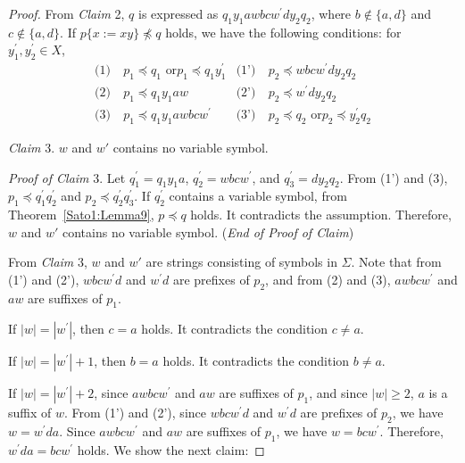 \begin{proof}
  \smallskip

  From \textit{Claim} 2, $q$ is expressed as $q_{1}y_{1}awbcw^{\prime}dy_{2}q_{2}$, where $b \not\in \{a,d\}$ and $c \not\in \{a,d\}$.
  If $p \{ x := xy \} \not \preceq q$ holds, we have the following conditions:
  for $y_{1}^{\prime},y_{2}^{\prime}\in X$,
  \begin{align*}
    \textrm{(1)}~& p_{1} \preceq q_{1} \mbox{ or} p_{1} \preceq q_{1}y_{1}^{\prime} & \textrm{(1')}~& p_{2} \preceq wbcw^{\prime}dy_{2}q_{2} \\
    \textrm{(2)}~& p_{1} \preceq q_{1}y_{1}aw & \textrm{(2')}~& p_{2} \preceq w^{\prime}dy_{2}q_{2} \\
    \textrm{(3)}~& p_{1} \preceq q_{1}y_{1}awbcw^{\prime} & \textrm{(3')}~& p_{2} \preceq q_{2} \mbox{ or} p_{2} \preceq y_{2}^{\prime}q_{2}
  \end{align*}

  \smallskip

  \noindent
  \textit{Claim} 3. $w$ and $w'$ contains no variable symbol.

  \smallskip
  \noindent
  \textit{Proof of Claim} 3.
  Let $q_{1}^{\prime} = q_{1}y_{1}a$, $q_{2}^{\prime} = wbcw^{\prime}$, and $q_{3}^{\prime} = dy_{2}q_{2}$. From (1') and (3), $p_{1} \preceq q^{\prime}_{1}q^{\prime}_{2}$ and $p_{2} \preceq q^{\prime}_{2}q^{\prime}_{3}$. If $q_{2}^{\prime}$ contains a variable symbol, from Theorem~\ref{Sato1:Lemma9}, $p \preceq q$ holds. It contradicts the assumption. Therefore, $w$ and $w'$ contains no variable symbol. (\textit{End of Proof of Claim})

  \smallskip

  From \textit{Claim} 3, $w$ and $w'$ are strings consisting of symbols in $\Sigma$. Note that from (1') and (2'), $wbcw^{\prime}d$ and $w^{\prime}d$ are prefixes of $p_{2}$, and from (2) and (3), $awbcw^{\prime}$ and $aw$ are suffixes of $p_{1}$.

  If $|w|=|w^{\prime}|$, then $c=a$ holds.
  It contradicts the condition $c \not = a$.
  
  If $|w|=|w^{\prime}|+1$, then $b = a$ holds.
  It contradicts the condition $b \not = a$.
  
  If $|w| = |w^{\prime}|+2$, since $awbcw^{\prime}$ and $aw$ are suffixes of $p_{1}$, and since $|w|\geq 2$, $a$ is a suffix of $w$.
  From (1') and (2'), since $wbcw^{\prime}d$ and $w^{\prime}d$ are prefixes of $p_{2}$, we have $w=w^{\prime}da$.
  Since $awbcw^{\prime}$ and $aw$ are suffixes of $p_{1}$, we have $w=bcw^{\prime}$.
  Therefore, $w^{\prime}da = bcw^{\prime}$ holds. We show the next claim:


\end{proof}

